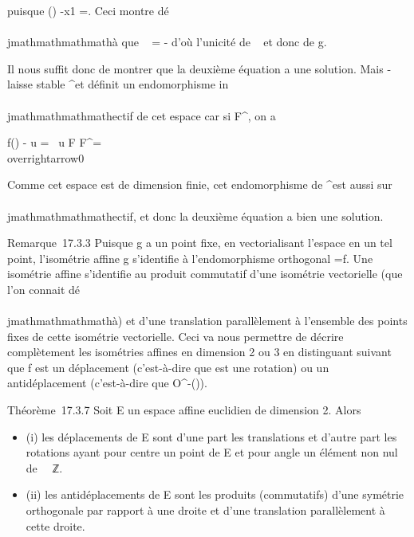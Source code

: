 puisque
\vecf()
-\overrightarrow x1
=. Ceci montre dé\\\\jmathmathmathmathà que
\overrightarrow\xi~ =
- d'où l'unicité de
\overrightarrow\xi~ et donc de g.

Il nous suffit donc de montrer que la deuxième équation a une solution.
Mais \vecf -\mathrmId laisse
stable \overrightarrowF^\bot et définit un
endomorphisme in\\\\jmathmathmathmathectif de cet espace car si
\overrightarrowu \in\overrightarrow
F^\bot, on a

f(\overrightarrowu) -\overrightarrow
u =
\rigtharrow~\overrightarrow u \in\overrightarrow
F \bigcap\overrightarrow F^\bot =
\\overrightarrow0\

Comme cet espace est de dimension finie, cet endomorphisme de
\overrightarrowF^\bot est aussi sur\\\\jmathmathmathmathectif, et
donc la deuxième équation a bien une solution.

Remarque~17.3.3 Puisque g a un point fixe, en vectorialisant l'espace en
un tel point, l'isométrie affine g s'identifie à l'endomorphisme
orthogonal \vecg =\vec f. Une
isométrie affine s'identifie au produit commutatif d'une isométrie
vectorielle (que l'on connait dé\\\\jmathmathmathmathà) et d'une translation parallèlement à
l'ensemble des points fixes de cette isométrie vectorielle. Ceci va nous
permettre de décrire complètement les isométries affines en dimension 2
ou 3 en distinguant suivant que f est un déplacement (c'est-à-dire que
\vecf est une rotation) ou un antidéplacement
(c'est-à-dire que \vecf \in
O^-(\overrightarrowE)).

Théorème~17.3.7 Soit E un espace affine euclidien de dimension 2. Alors

\begin{itemize}
\itemsep1pt\parskip0pt
\item
  (i) les déplacements de E sont d'une part les translations et d'autre
  part les rotations ayant pour centre un point de E et pour angle un
  élément non nul de ~\pi~ℤ.
\item
  (ii) les antidéplacements de E sont les produits (commutatifs) d'une
  symétrie orthogonale par rapport à une droite et d'une translation
  parallèlement à cette droite.
\end{itemize}

